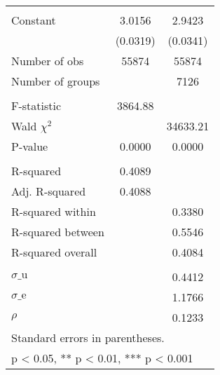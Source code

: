 {\begin{tabular}{l*{2}{c}}
                    &                     &                     \\
Constant            &      3.0156\sym{***}&      2.9423\sym{***}\\
                    &    (0.0319)         &    (0.0341)         \\
\midrule
Number of obs       &       55874         &       55874         \\
Number of groups    &                     &        7126         \\
\\ F-statistic      &     3864.88         &                     \\
Wald $\chi^2$       &                     &    34633.21         \\
P-value             &      0.0000         &      0.0000         \\
\\ R-squared        &      0.4089         &                     \\
Adj. R-squared      &      0.4088         &                     \\
R-squared within    &                     &      0.3380         \\
R-squared between   &                     &      0.5546         \\
R-squared overall   &                     &      0.4084         \\
\\ $\sigma\text{\_u}$&                     &      0.4412         \\
$\sigma\text{\_e}$   &                     &      1.1766         \\
$\rho$              &                     &      0.1233         \\
\bottomrule
\multicolumn{3}{l}{\footnotesize Standard errors in parentheses.}\\
\multicolumn{3}{l}{\footnotesize * p < 0.05, ** p < 0.01, *** p < 0.001}\\
\end{tabular}
}
